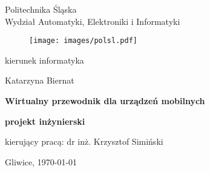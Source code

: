 


\begin{titlepage}

\noindent
\begin{center}
    \Large
    Politechnika Śląska\\
    Wydział Automatyki, Elektroniki i Informatyki
\end{center}

\begin{figure}[h]
\begin{center}
\texttt{[image: images/polsl.pdf]}
\end{center}
\end{figure}

\begin{center}
    \Large
    kierunek informatyka
\end{center}

\vfill
\begin{center}
    \Large
    Katarzyna Biernat
\end{center}

\vfill
\begin{center}
    \Huge\bfseries
    Wirtualny przewodnik dla urządzeń mobilnych
\end{center}

\vfill
\begin{center}
    \LARGE\bfseries
    projekt inżynierski
\end{center}

\vfill\vfill\vfill
\begin{center}
    \Large
    kierujący pracą:  dr inż. Krzysztof Simiński
\end{center}

\vfill
\begin{center}
\large
   Gliwice, \today
\end{center}

\end{titlepage}
\restoregeometry
\cleardoublepage


\rmfamily
\normalfont

\pagestyle{headings}
\tableofcontents



